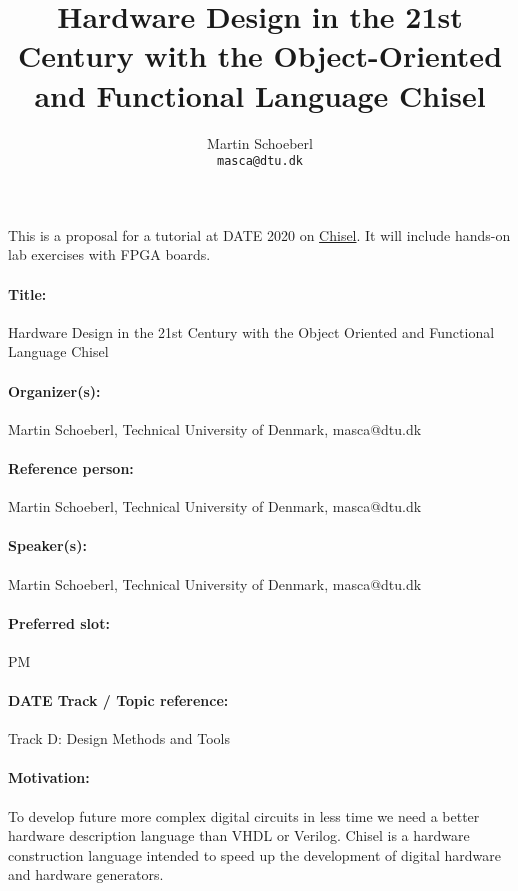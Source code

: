 \documentclass{article}
\begin{document}
\title{Hardware Design in the 21st Century with the Object-Oriented and Functional Language Chisel}

\author{Martin Schoeberl\\
\texttt{masca@dtu.dk}}


\maketitle \thispagestyle{empty}

This is a proposal for a tutorial at DATE 2020 on \href{https://chisel.eecs.berkeley.edu/}{Chisel}.
It will include hands-on lab exercises with FPGA boards.


\paragraph{Title:} Hardware Design in the 21st Century with the Object Oriented and Functional Language Chisel
\paragraph{Organizer(s):} Martin Schoeberl, Technical University of Denmark, masca@dtu.dk
\paragraph{Reference person:} Martin Schoeberl, Technical University of Denmark, masca@dtu.dk
\paragraph{Speaker(s):} Martin Schoeberl, Technical University of Denmark, masca@dtu.dk
\paragraph{Preferred slot:} PM
\paragraph{DATE Track / Topic reference:} Track D: Design Methods and Tools

\paragraph{Motivation:}

To develop future more complex digital circuits in less time we need a better hardware description
language than VHDL or Verilog. Chisel is a hardware construction language intended to
speed up the development of digital hardware and hardware generators.
\end{document}
